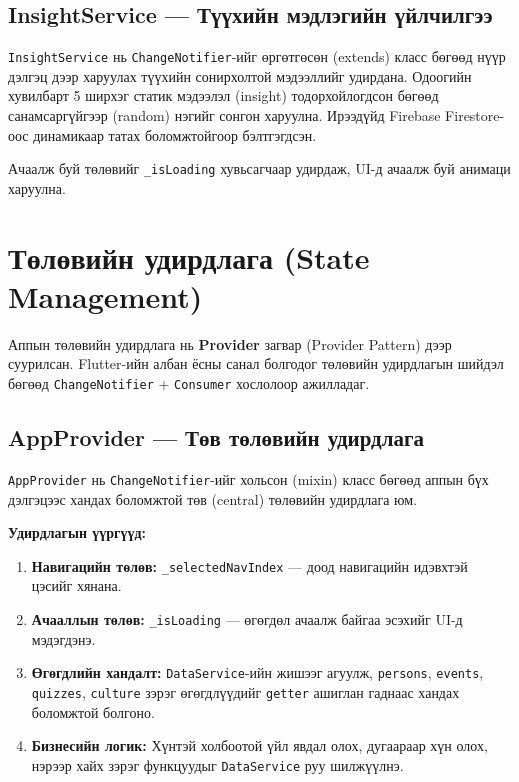 \subsection{InsightService — Түүхийн мэдлэгийн үйлчилгээ}

\texttt{InsightService} нь \texttt{ChangeNotifier}-ийг өргөтгөсөн (extends) класс бөгөөд нүүр дэлгэц дээр харуулах түүхийн сонирхолтой мэдээллийг удирдана. Одоогийн хувилбарт 5 ширхэг статик мэдээлэл (insight) тодорхойлогдсон бөгөөд санамсаргүйгээр (random) нэгийг сонгон харуулна. Ирээдүйд Firebase Firestore-оос динамикаар татах боломжтойгоор бэлтгэгдсэн.

Ачаалж буй төлөвийг \texttt{\_isLoading} хувьсагчаар удирдаж, UI-д ачаалж буй анимаци харуулна.

\section{Төлөвийн удирдлага (State Management)}

Аппын төлөвийн удирдлага нь \textbf{Provider} загвар (Provider Pattern) дээр суурилсан. Flutter-ийн албан ёсны санал болгодог төлөвийн удирдлагын шийдэл бөгөөд \texttt{ChangeNotifier} + \texttt{Consumer} хослолоор ажилладаг.

\subsection{AppProvider — Төв төлөвийн удирдлага}

\texttt{AppProvider} нь \texttt{ChangeNotifier}-ийг хольсон (mixin) класс бөгөөд аппын бүх дэлгэцээс хандах боломжтой төв (central) төлөвийн удирдлага юм.

\textbf{Удирдлагын үүргүүд:}

\begin{enumerate}
	\item \textbf{Навигацийн төлөв:} \texttt{\_selectedNavIndex} — доод навигацийн идэвхтэй цэсийг хянана.
	\item \textbf{Ачааллын төлөв:} \texttt{\_isLoading} — өгөгдөл ачаалж байгаа эсэхийг UI-д мэдэгдэнэ.
	\item \textbf{Өгөгдлийн хандалт:} \texttt{DataService}-ийн жишээг агуулж, \texttt{persons}, \texttt{events}, \texttt{quizzes}, \texttt{culture} зэрэг өгөгдлүүдийг \texttt{getter} ашиглан гаднаас хандах боломжтой болгоно.
	\item \textbf{Бизнесийн логик:} Хүнтэй холбоотой үйл явдал олох, дугаараар хүн олох, нэрээр хайх зэрэг функцуудыг \texttt{DataService} руу шилжүүлнэ.
\end{enumerate}

